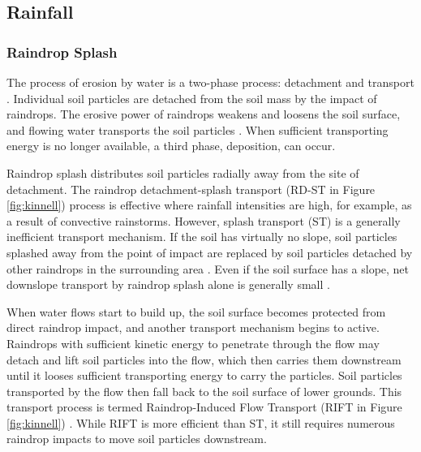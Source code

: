 
\subsection{Rainfall}
\label{sec:RainfallCharacteristics}

\subsubsection{Raindrop Splash}
\label{sec:RaindropSplash}

The process of erosion by water is a two-phase process: detachment and transport
\citep{morgan1995-soil}. Individual soil particles are detached from the soil
mass by the impact of raindrops. The erosive power of raindrops weakens and
loosens the soil surface, and flowing water transports the soil particles
\citep{kinnell2000-discourse}. When sufficient transporting energy is no longer
available, a third phase, deposition, can occur.

Raindrop splash distributes soil particles radially away from the site of
detachment. The raindrop detachment-splash transport (RD-ST in Figure
\ref{fig:kinnell}) process is effective where rainfall intensities are high, for
example, as a result of convective rainstorms. However, splash transport (ST) is
a generally inefficient transport mechanism. If the soil has virtually no slope,
soil particles splashed away from the point of impact are replaced by soil
particles detached by other raindrops in the surrounding area
\citep{kinnell2000-discourse,zartl2001-25}. Even if the soil surface has a
slope, net downslope transport by raindrop splash alone is generally small
\citep{kinnell2001-749}.

When water flows start to build up, the soil surface becomes protected from
direct raindrop impact, and another transport mechanism begins to active.
Raindrops with sufficient kinetic energy to penetrate through the flow may
detach and lift soil particles into the flow, which then carries them downstream
until it looses sufficient transporting energy to carry the particles. Soil
particles transported by the flow then fall back to the soil surface of lower
grounds. This transport process is termed Raindrop-Induced Flow Transport (RIFT
in Figure \ref{fig:kinnell}) \citep{kinnell1990-497}. While RIFT is more
efficient than ST, it still requires numerous raindrop impacts to move soil
particles downstream.


